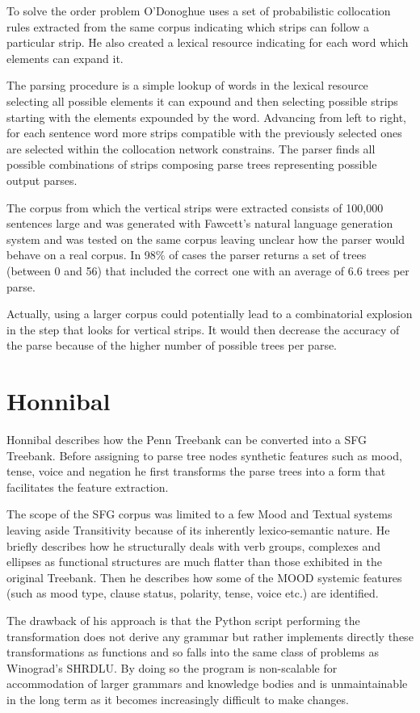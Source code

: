 To solve the order problem O'Donoghue uses a set of probabilistic collocation rules extracted from the same corpus indicating which strips can follow a particular strip. He also created a lexical resource indicating for each word which elements can expand it.

The parsing procedure is a simple lookup of words in the lexical resource selecting all possible elements it can expound and then selecting possible strips starting with the elements expounded by the word. Advancing from left to right, for each sentence word more strips compatible with the previously selected ones are selected within the collocation network constrains. The parser finds all possible combinations of strips composing parse trees representing possible output parses. 

The corpus from which the vertical strips were extracted consists of 100,000 sentences large and was generated with Fawcett's natural language generation system and was tested on the same corpus leaving unclear how the parser would behave on a real corpus. In 98\% of cases the parser returns a set of trees (between 0 and 56) that included the correct one with an average of 6.6 trees per parse. 

Actually, using a larger corpus could potentially lead to a combinatorial explosion in the step that looks for vertical strips. It would then decrease the accuracy of the parse because of the higher number of possible trees per parse.

\section{Honnibal}
Honnibal \citeyearpar{Honnibal2004a,Honnibal2007} describes how the Penn Treebank can be converted into a SFG Treebank. Before assigning to parse tree nodes synthetic features such as mood, tense, voice and negation he first transforms the parse trees into a form that facilitates the feature extraction. 

The scope of the SFG corpus was limited to a few Mood and Textual systems leaving aside Transitivity because of its inherently lexico-semantic nature. He briefly describes how he structurally deals with verb groups, complexes and ellipses as functional structures are much flatter than those exhibited in the original Treebank. Then he describes how some of the MOOD systemic features (such as mood type, clause status, polarity, tense, voice etc.) are identified.

The drawback of his approach is that the Python script performing the transformation does not derive any grammar but rather implements directly these transformations as functions and so falls into the same class of problems as Winograd's SHRDLU. By doing so the program is non-scalable for accommodation of larger grammars and knowledge bodies and is unmaintainable in the long term as it becomes increasingly difficult to make changes. 

